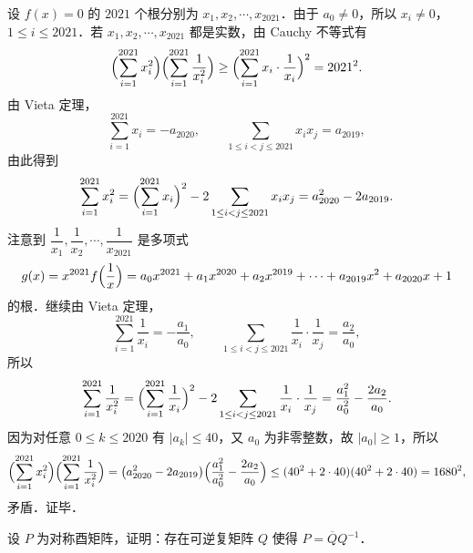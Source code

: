\begin{solution}
设 $f(x)=0$ 的 $2021$ 个根分别为 $x_1,x_2,\cdots,x_{2021}$．由于 $a_0\ne 0$，所以 $x_i\ne 0$，$1\le i\le 2021$．若 $x_1,x_2,\cdots,x_{2021}$ 都是实数，由 Cauchy 不等式有
\[
  \Bigl(\sum_{i=1}^{2021}x_i^2\Bigr)\Bigl(\sum_{i=1}^{2021}\frac{1}{x_i^2}\Bigr)
  \ge\Bigl(\sum_{i=1}^{2021}x_i\cdot\frac{1}{x_i}\Bigr)^2=2021^2.
\]
由 Vieta 定理，
\[
  \sum_{i=1}^{2021}x_i=-a_{2020},\qquad
  \sum_{1\le i<j\le 2021}x_ix_j=a_{2019},
\]
由此得到
\[
  \sum_{i=1}^{2021}x_i^2=\Bigl(\sum_{i=1}^{2021}x_i\Bigr)^2-2\sum_{1\le i<j\le 2021}x_ix_j=a_{2020}^2-2a_{2019}.
\]
注意到 $\dfrac{1}{x_1},\dfrac{1}{x_2},\cdots,\dfrac{1}{x_{2021}}$ 是多项式
\[
  g(x)=x^{2021}f\Bigl(\frac{1}{x}\Bigr)
  =a_0x^{2021}+a_1x^{2020}+a_2x^{2019}+\cdots+a_{2019}x^2+a_{2020}x+1
\]
的根．继续由 Vieta 定理，
\[
  \sum_{i=1}^{2021}\frac{1}{x_i}=-\frac{a_1}{a_0},\qquad
  \sum_{1\le i<j\le 2021}\frac{1}{x_i}\cdot\frac{1}{x_j}=\frac{a_2}{a_0},
\]
所以
\[
  \sum_{i=1}^{2021}\frac{1}{x_i^2}
  =\Bigl(\sum_{i=1}^{2021}\frac{1}{x_i}\Bigr)^2-2\sum_{1\le i<j\le 2021}\frac{1}{x_i}\cdot\frac{1}{x_j}
  =\frac{a_1^2}{a_0^2}-\frac{2a_2}{a_0}.
\]
因为对任意 $0\le k\le 2020$ 有 $|a_k|\le 40$，又 $a_0$ 为非零整数，故 $|a_0|\ge 1$，所以
\[
  \Bigl(\sum_{i=1}^{2021}x_i^2\Bigr)\Bigl(\sum_{i=1}^{2021}\frac{1}{x_i^2}\Bigr)
  =\bigl(a_{2020}^2-2a_{2019}\bigr)\Bigl(\frac{a_1^2}{a_0^2}-\frac{2a_2}{a_0}\Bigr)
  \le(40^2+2\cdot 40)(40^2+2\cdot 40)=1680^2,
\]
矛盾．证毕．
\end{solution}

设 $P$ 为对称酉矩阵，证明：存在可逆复矩阵 $Q$ 使得 $P=\overline{Q}Q^{-1}$．

